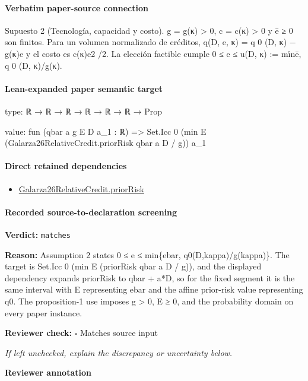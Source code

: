 \documentclass[10pt]{article}
\newcommand{\reviewerbox}{%
  \par\noindent\fbox{\parbox{0.96\linewidth}{\rule{0pt}{0.38in}}}\par
}
\newcommand{\reviewmatch}[1]{%
  \par\noindent\textbf{Reviewer check:} $\square$\; #1\par
  \noindent\emph{If left unchecked, explain the discrepancy or uncertainty below.}\par
}
\begin{document}
\paragraph{Verbatim paper-source connection}
\begin{ReviewVerbatim}
Supuesto 2 (Tecnología, capacidad y costo). g = g(κ) > 0, c = c(κ) > 0 y ē ≥ 0 son ﬁnitos.
Para un volumen normalizado de créditos, q(D, e, κ) = q 0 (D, κ) − g(κ)e y el costo es c(κ)e2 /2. La
elección factible cumple
0 ≤ e ≤ u(D, κ) := mı́n{ē, q 0 (D, κ)/g(κ)}.
\end{ReviewVerbatim}



\paragraph{Lean-expanded paper semantic target}
\begin{ReviewVerbatim}
type:
ℝ → ℝ → ℝ → ℝ → ℝ → ℝ → Prop

value:
fun (qbar a g E D a_1 : ℝ) => Set.Icc 0 (min E (Galarza26RelativeCredit.priorRisk qbar a D / g)) a_1
\end{ReviewVerbatim}

\paragraph{Direct retained dependencies}
\begin{itemize}\raggedright
\item \hyperlink{paper-prerequisite-e8657fe6a37f000a}{Galarza26\allowbreak{}Relative\allowbreak{}Credit.\allowbreak{}prior\allowbreak{}Risk}
\end{itemize}
\paragraph{Recorded source-to-declaration screening}
\textbf{Verdict:} \texttt{matches}
\\
{\raggedright
\textbf{Reason:} Assumption 2 states 0 ≤ e ≤ min\{ebar, q0(D,kappa)/\allowbreak{}g(kappa)\}.\allowbreak{} The target is Set.\allowbreak{}Icc 0 (min E (priorRisk qbar a D /\allowbreak{} g)), and the displayed dependency expands priorRisk to qbar + a*D, so for the fixed segment it is the same interval with E representing ebar and the affine prior-\allowbreak{}risk value representing q0.\allowbreak{} The proposition-\allowbreak{}1 use imposes g > 0, E ≥ 0, and the probability domain on every paper instance.\allowbreak{}
\par}
\reviewmatch{Matches source input}
\noindent\textbf{Reviewer annotation}\par
\reviewerbox
\clearpage
\hypertarget{paper-prerequisite-a6fae381e2d9a684}{}
\end{document}
